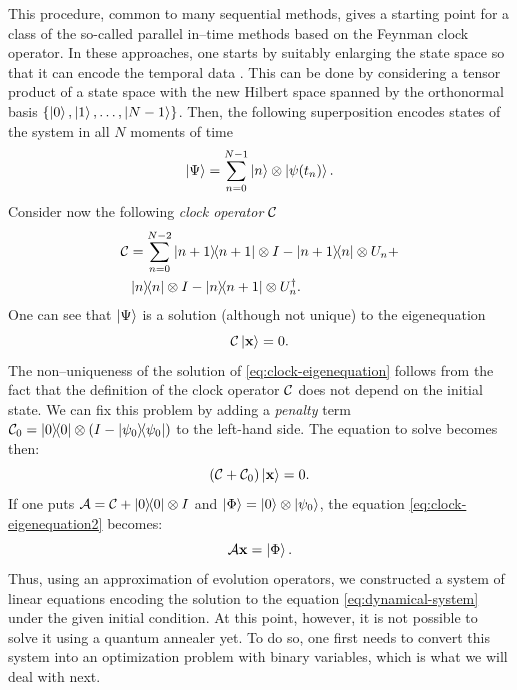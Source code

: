 This procedure, common to many sequential methods, gives a starting point for a
class of the so-called parallel in--time methods based on the Feynman clock
operator. In these approaches, one starts by suitably enlarging the state space
so that it can encode the temporal data \cite{feynmanclock}. This can be done
by considering a tensor product of a state space with the new Hilbert space
spanned by the orthonormal basis $\{\ket{0}, \ket{1}, \ldots, \ket{N-1}\}$.
Then, the following superposition encodes states of the system in all $N$
moments of time
%
\begin{equation}
  \ket{\Psi} = \sum_{n=0}^{N-1} \ket{n} \otimes \ket{\psi(t_n)}.
\end{equation}
Consider now the following \emph{clock operator} $\mathcal{C}$
\begin{eqnarray}
  \label{eq:clock2}
  \mathcal{C}
  & =
  \sum_{n=0}^{N-2}
  \ketbra{n+1}{n+1} \otimes I - \ketbra{n+1}{n} \otimes U_n + \\
  &\ketbra{n}{n} \otimes I - \ketbra{n}{n+1}\otimes U_{n}^{\dagger}.
\end{eqnarray}
One can see that $\ket{\Psi}$ is a solution (although not unique) to the
eigenequation
\begin{equation}
  \label{eq:clock-eigenequation}
  \mathcal{C} \ket{\mathbf{x}} = 0.
\end{equation}
The non--uniqueness of the solution of \ref{eq:clock-eigenequation} follows
from the fact that the definition of the clock operator $\mathcal{C}$ does not
depend on the initial state. We can fix this problem by adding a \emph{penalty}
term $\mathcal{C}_0 = \ketbra{0}{0}\otimes(I-\ketbra{\psi_0}{\psi_0})$ to the
left-hand side. The equation to solve becomes then:
\begin{equation}
  \label{eq:clock-eigenequation2}
  (\mathcal{C} + \mathcal{C}_0) \ket{\mathbf{x}} = 0.
\end{equation}
If one puts $\mathcal{A}=\mathcal{C} + \ketbra{0}{0} \otimes I$ and $\ket{\Phi} =
  \ket{0}\otimes \ket{\psi_0}$, the equation \ref{eq:clock-eigenequation2}
becomes:
\begin{equation}
  \label{eq:gsys}
  \mathcal{A} \mathbf{x} = \ket{\Phi}.
\end{equation}
Thus, using an approximation of evolution operators, we constructed a system of
linear equations encoding the solution to the equation
\eqref{eq:dynamical-system} under the given initial condition. At this point,
however, it is not possible to solve it using a quantum annealer yet. To do so,
one first needs to convert this system into an optimization problem with binary
variables, which is what we will deal with next.
